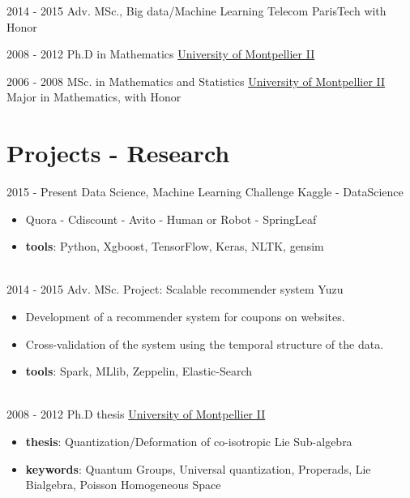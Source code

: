 \documentclass[letterpaper]{twentysecondcv} %
\begin{document}
\begin{twenty} %
	\twentyitemshorttest
    	{2014 - 2015}
        {}
        {Adv. MSc., Big data/Machine Learning}
        {Telecom ParisTech}
        {with Honor}
				
	\twentyitemshorttest
    	{2008 - 2012}
		{}
        {Ph.D in Mathematics}
        {\href{http://www.umontpellier.fr/}{University of Montpellier II}}
        {}
				
	\twentyitemshorttest
    	{2006 - 2008}
		{}
        {MSc. in Mathematics and Statistics}
        {\href{http://www.umontpellier.fr/}{University of Montpellier II}}
        {Major in Mathematics, with Honor}
\end{twenty}

\section{Projects - Research}{\faClipboard}
\begin{twenty}
	\twentyitem
			{2015 - }
			{Present}
			{Data Science, Machine Learning Challenge}
			{Kaggle - DataScience}
			{}
			{\vspace{-2mm}\begin{itemize}[topsep=0pt,partopsep=0pt]
			 \item Quora - Cdiscount - Avito - Human or Robot - SpringLeaf
			 \item \textbf{tools}: Python, Xgboost, TensorFlow, Keras, NLTK, gensim
			\end{itemize}} \\
			
	\twentyitem
    	{2014 - 2015}
		{}
        {Adv. MSc. Project: Scalable recommender system}
        {Yuzu}
        {}
        {\vspace{-2mm}\begin{itemize}[topsep=0pt,partopsep=0pt]
        \item Development of a recommender system for coupons on websites.
				\item Cross-validation of the system using the temporal structure of the data.
        \item \textbf{tools}: Spark, MLlib, Zeppelin, Elastic-Search
		\end{itemize}} \\
		
	\twentyitem
			{2008 - 2012}
			{}
			{Ph.D thesis}
			{\href{http://www.umontpellier.fr/}{University of Montpellier II}}
			{}
			{\vspace{-2mm}\begin{itemize}[topsep=0pt,partopsep=0pt]
			\item \textbf{thesis}: Quantization/Deformation of co-isotropic Lie Sub-algebra
			\item \textbf{keywords}: Quantum Groups, Universal quantization, Properads, Lie Bialgebra, Poisson Homogeneous Space
			\end{itemize}}
\end{twenty}
\end{document}
